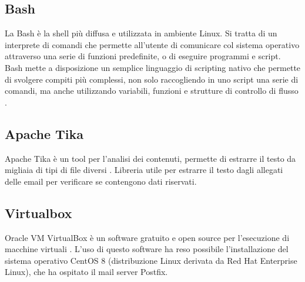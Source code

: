     
    \subsection{Bash}
    La Bash è la shell più diffusa e utilizzata in ambiente Linux. 
    Si tratta di un interprete di comandi che permette all'utente di comunicare col sistema operativo attraverso una
    serie di funzioni predefinite, o di eseguire programmi e script.
    Bash mette a disposizione un semplice linguaggio di scripting nativo che permette di svolgere compiti 
    più complessi, non solo raccogliendo in uno script una serie di comandi, 
    ma anche utilizzando variabili, funzioni e strutture di controllo di flusso \cite{Bash1}.
    
    \subsection{Apache Tika}
    Apache Tika è un tool per l’analisi dei contenuti, permette di estrarre il testo da migliaia di tipi di file diversi \cite{tika}.
    Libreria utile per estrarre il testo dagli allegati delle email per verificare se contengono dati riservati. 
    
    \subsection{Virtualbox}
    Oracle VM VirtualBox è un software gratuito e open source per l'esecuzione di macchine virtuali \cite{VirtualBox1}.
    L'uso di questo software ha reso possibile l'installazione del sistema operativo CentOS 8 
    (distribuzione Linux derivata da Red Hat Enterprise Linux), che ha ospitato il mail server Postfix.
